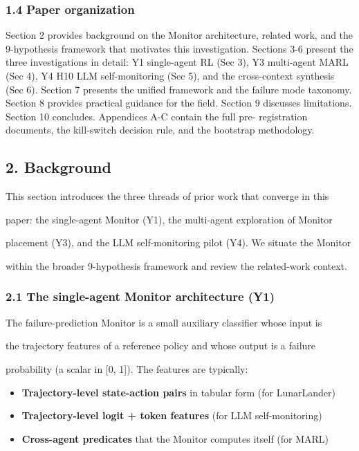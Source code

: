 \documentclass[
]{article}
\begin{document}
\subsubsection{1.4 Paper organization}\label{paper-organization}

Section 2 provides background on the Monitor architecture, related work,
and the 9-hypothesis framework that motivates this investigation.
Sections 3-6 present the three investigations in detail: Y1 single-agent
RL (Sec 3), Y3 multi-agent MARL (Sec 4), Y4 H10 LLM self-monitoring (Sec
5), and the cross-context synthesis (Sec 6). Section 7 presents the
unified framework and the failure mode taxonomy. Section 8 provides
practical guidance for the field. Section 9 discusses limitations.
Section 10 concludes. Appendices A-C contain the full pre- registration
documents, the kill-switch decision rule, and the bootstrap methodology.

\subsection{2. Background}\label{background}

This section introduces the three threads of prior work that converge in
this

paper: the single-agent Monitor (Y1), the multi-agent exploration of
Monitor

placement (Y3), and the LLM self-monitoring pilot (Y4). We situate the
Monitor

within the broader 9-hypothesis framework and review the related-work
context.

\subsubsection{2.1 The single-agent Monitor architecture
(Y1)}\label{the-single-agent-monitor-architecture-y1}

The failure-prediction Monitor is a small auxiliary classifier whose
input is

the trajectory features of a reference policy and whose output is a
failure

probability (a scalar in {[}0, 1{]}). The features are typically:

\begin{itemize}
\item
  \textbf{Trajectory-level state-action pairs} in tabular form (for
  LunarLander)
\item
  \textbf{Trajectory-level logit + token features} (for LLM
  self-monitoring)
\item
  \textbf{Cross-agent predicates} that the Monitor computes itself (for
  MARL)
\end{itemize}
\end{document}
